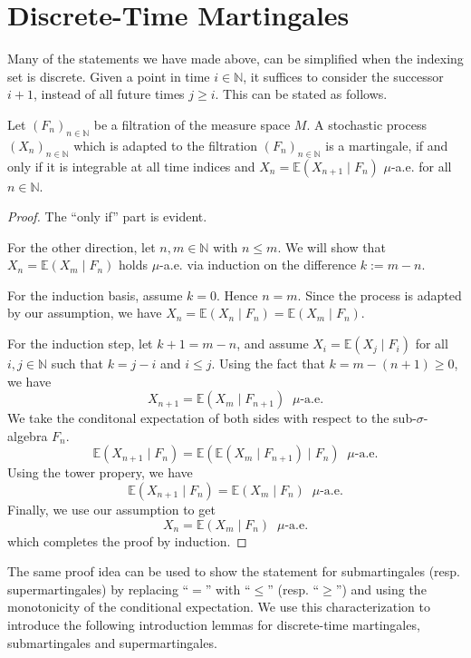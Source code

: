 \section{Discrete-Time Martingales}

Many of the statements we have made above, can be simplified when the indexing set is discrete. Given a point in time $i \in \mathbb{N}$, it suffices to consider the successor $i + 1$, instead of all future times $j \ge i$. This can be stated as follows.

\begin{lemma}
	Let $(F_n)_{n \in \mathbb{N}}$ be a filtration of the measure space $M$. A stochastic process $(X_n)_{n \in \mathbb{N}}$ which is adapted to the filtration $(F_n)_{n \in \mathbb{N}}$ is a martingale, if and only if it is integrable at all time indices and $X_n = \mathbb{E}(X_{n + 1} \;\vert\; F_n)$ $\mu$-a.e. for all $n \in \mathbb{N}$.
\end{lemma}
\begin{proof}
	The ``only if'' part is evident.
	
	For the other direction, let $n, m \in \mathbb{N}$ with $n \le m$. We will show that $X_n = \mathbb{E}(X_m \;\vert\; F_n)$ holds $\mu$-a.e. via induction on the difference $k := m - n$. 
	
	For the induction basis, assume $k = 0$. Hence $n = m$. Since the process is adapted by our assumption, we have $X_n = \mathbb{E}(X_n \;\vert\; F_n) = \mathbb{E}(X_m \;\vert\; F_n)$.
	
	For the induction step, let $k + 1 = m - n$, and assume $X_i = \mathbb{E}(X_j \;\vert\; F_i)$ for all $i, j \in \mathbb{N}$ such that $k = j - i$ and $i \le j$. Using the fact that $k = m - (n + 1) \ge 0$, we have
	\[
		X_{n + 1} = \mathbb{E}(X_m \;\vert\; F_{n + 1}) \;\;\mu\textrm{-a.e.}
	\]
	We take the conditonal expectation of both sides with respect to the sub-$\sigma$-algebra $F_n$.
	\[
		\mathbb{E}(X_{n + 1} \;\vert\; F_n) =  \mathbb{E}(\mathbb{E}(X_m \;\vert\; F_{n + 1}) \;\vert\; F_n) \;\;\mu\textrm{-a.e.}
	\]
	Using the tower propery, we have
	\[
		\mathbb{E}(X_{n + 1} \;\vert\; F_n) =  \mathbb{E}(X_m \;\vert\; F_n) \;\;\mu\textrm{-a.e.}
	\]
	Finally, we use our assumption to get
	\[
		X_n =  \mathbb{E}(X_m \;\vert\; F_n) \;\;\mu\textrm{-a.e.}
	\]	
	which completes the proof by induction.
\end{proof}

The same proof idea can be used to show the statement for submartingales (resp. supermartingales) by replacing ``$=$'' with ``$\le$'' (resp. ``$\ge$'') and using the monotonicity of the conditional expectation. We use this characterization to introduce the following introduction lemmas for discrete-time martingales, submartingales and supermartingales.

